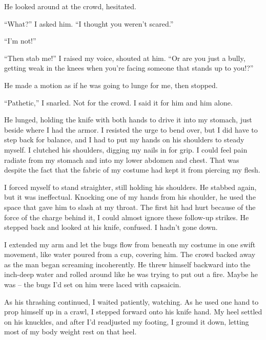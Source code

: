 He looked around at the crowd, hesitated.



``What?'' I asked him.  ``I thought you weren't scared.''



``I'm not!''



``Then stab me!'' I raised my voice, shouted at him.  ``Or are you just a bully, getting weak in the knees when you're facing someone that stands up to you!?''



He made a motion as if he was going to lunge for me, then stopped.



``Pathetic,'' I snarled.  Not for the crowd.  I said it for him and him alone.



He lunged, holding the knife with both hands to drive it into my stomach, just beside where I had the armor.  I resisted the urge to bend over, but I did have to step back for balance, and I had to put my hands on his shoulders to steady myself.   I clutched his shoulders, digging my nails in for grip.  I could feel pain radiate from my stomach and into my lower abdomen and chest.  That was despite the fact that the fabric of my costume had kept it from piercing my flesh.



I forced myself to stand straighter, still holding his shoulders.  He stabbed again, but it was ineffectual.  Knocking one of my hands from his shoulder, he used the space that gave him to slash at my throat.  The first hit had hurt because of the force of the charge behind it, I could almost ignore these follow-up strikes.  He stepped back and looked at his knife, confused.  I hadn't gone down.



I extended my arm and let the bugs flow from beneath my costume in one swift movement, like water poured from a cup, covering him.  The crowd backed away as the man began screaming incoherently.  He threw himself backward into the inch-deep water and rolled around like he was trying to put out a fire.  Maybe he was – the bugs I'd set on him were laced with capsaicin.



As his thrashing continued, I waited patiently, watching.  As he used one hand to prop himself up in a crawl, I stepped forward onto his knife hand.  My heel settled on his knuckles, and after I'd readjusted my footing, I ground it down, letting most of my body weight rest on that heel.



